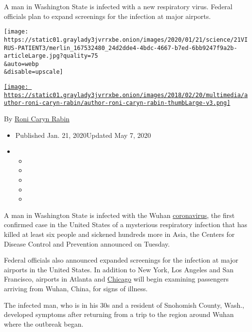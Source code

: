 A man in Washington State is infected with a new respiratory virus.
Federal officials plan to expand screenings for the infection at major
airports.

\texttt{[image: https://static01.graylady3jvrrxbe.onion/images/2020/01/21/science/21VIRUS-PATIENT3/merlin\_167532480\_24d2dde4-4bdc-4667-b7ed-6bb9247f9a2b-articleLarge.jpg?quality=75\\\&auto=webp\\\&disable=upscale]}

\href{https://www.nytimes3xbfgragh.onion/by/roni-caryn-rabin}{\texttt{[image: https://static01.graylady3jvrrxbe.onion/images/2018/02/20/multimedia/author-roni-caryn-rabin/author-roni-caryn-rabin-thumbLarge-v3.png]}}

By \href{https://www.nytimes3xbfgragh.onion/by/roni-caryn-rabin}{Roni
Caryn Rabin}

\begin{itemize}
\item
  Published Jan. 21, 2020Updated May 7, 2020
\item
  \begin{itemize}
  \item
  \item
  \item
  \item
  \item
  \end{itemize}
\end{itemize}

A man in Washington State is infected with the Wuhan
\href{https://www.nytimes3xbfgragh.onion/2020/05/07/science/ultraviolet-light-coronavirus.html}{coronavirus},
the first confirmed case in the United States of a mysterious
respiratory infection that has killed at least six people and sickened
hundreds more in Asia, the Centers for Disease Control and Prevention
announced on Tuesday.

Federal officials also announced expanded screenings for the infection
at major airports in the United States. In addition to New York, Los
Angeles and San Francisco, airports in Atlanta and
\href{https://www.nytimes3xbfgragh.onion/2020/01/24/health/chicago-coronavirus-cdc.html}{Chicago}
will begin examining passengers arriving from Wuhan, China, for signs of
illness.

The infected man, who is in his 30s and a resident of Snohomish County,
Wash., developed symptoms after returning from a trip to the region
around Wuhan where the outbreak began.

\href{https://www.nytimes3xbfgragh.onion/interactive/2020/01/21/world/asia/china-coronavirus-maps.html}{}

